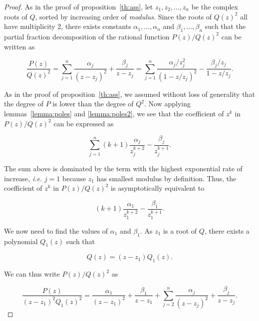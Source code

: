 \documentclass{article}
\begin{document}
\begin{proof}
As in the proof of proposition~\ref{th:ass}, let $z_1, z_2, \ldots, z_n$
be the complex roots of $Q$, sorted by increasing order of
\textit{modulus}. Since the roots of $Q(z)^2$ all have multiplicity 2,
there exists constants $\alpha_1, \ldots, \alpha_n$ and $\beta_1, \ldots,
\beta_n$ such that the partial fraction decomposition of the rational
function $P(z)/Q(z)^2$ can be written as

\begin{equation*}
\frac{P(z)}{Q(z)^2} = 
\sum_{j=1}^n \frac{\alpha_j}{(z-z_j)^2} + \frac{\beta_j}{z-z_j} =
\sum_{j=1}^n \frac{\alpha_j/z_j^2}{(1-z/z_j)^2}
-\frac{\beta_j/z_j}{1-z/z_j}.
\end{equation*}

As in the proof of proposition~\ref{th:ass}, we assumed without loss of
generality that the degree of $P$ is lower than the degree of $Q^2$. Now
applying lemmas~\ref{lemma:poles} and \ref{lemma:poles2}, we see that the
coefficient of $z^k$ in $P(z)/Q(z)^2$ can be expressed as

\begin{equation}
\label{eq:fullass2}
\sum_{j=1}^n (k+1)\frac{\alpha_j}{z_j^{k+2}}-\frac{\beta_j}{z_j^{k+1}}.
\end{equation}

The sum above is dominated by the term with the highest exponential rate
of increase, \textit{i.e.} $j=1$ because $z_1$ has smallest modulus by
definition. Thus, the coefficient of $z^k$ in $P(z)/Q(z)^2$ is
asymptotically equivalent to 

\begin{equation*}
(k+1)\frac{\alpha_1}{z_1^{k+2}}-\frac{\beta_1}{z_1^{k+1}}.
\end{equation*}

We now need to find the values of $\alpha_1$ and $\beta_1$. As $z_1$ is a
root of $Q$, there exists a polynomial $Q_1(z)$ such that

\begin{equation}
\label{eq:Q1}
Q(z) = (z-z_1)Q_1(z).
\end{equation}

We can thus write $P(z)/Q(z)^2$ as

\begin{equation}
\label{eq:misc1}
\frac{P(z)}{(z-z_1)^2Q_1(z)^2} = \frac{\alpha_1}{(z-z_1)^2} +
\frac{\beta_1}{z-z_1} +
\sum_{j=2}^n \frac{\alpha_j}{(z-z_j)^2} + \frac{\beta_j}{z-z_j}.
\end{equation}


\end{proof}
\end{document}
